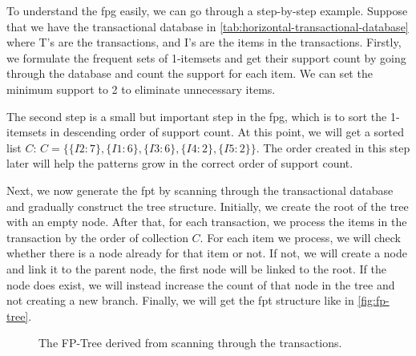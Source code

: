 To understand the \acl{fpg} easily, we can go through a step-by-step example.
Suppose that we have the transactional database in \autoref{tab:horizontal-transactional-database} where T's are the transactions, and I's are the items in the transactions. 
Firstly, we formulate the frequent sets of 1-itemsets and get their support count by going through the database and count the support for each item.
We can set the minimum support to 2 to eliminate unnecessary items.

The second step is a small but important step in the \acl{fpg}, which is to sort the 1-itemsets in descending order of support count.
At this point, we will get a sorted list $C$: $C=\{\{I2:7\}, \{I1:6\}, \{I3:6\}, \{I4:2\}, \{I5:2\}\}$.
The order created in this step later will help the patterns grow in the correct order of support count.

Next, we now generate the \acl{fpt} by scanning through the transactional database and gradually construct the tree structure. Initially, we create the root of the tree with an empty node.
After that, for each transaction, we process the items in the transaction by the order of collection $C$.
For each item we process, we will check whether there is a node already for that item or not.
If not, we will create a node and link it to the parent node, the first node will be linked to the root.
If the node does exist, we will instead increase the count of that node in the tree and not creating a new branch.
Finally, we will get the \acl{fpt} structure like in \autoref{fig:fp-tree}.

\begin{figure}
    \centering
    \caption{The FP-Tree derived from scanning through the transactions.}
    \label{fig:fp-tree}
\end{figure}

